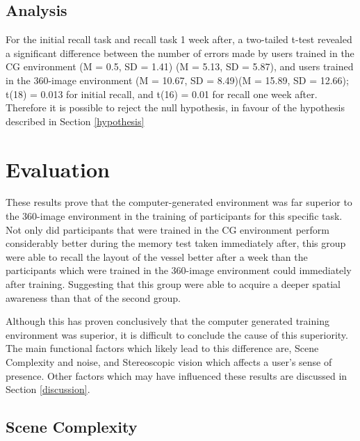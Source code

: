\documentclass[ %
                    author={Elis Jones},
                supervisor={Dr. Kirsten Cater},
                    degree={BSc},
                     title={The Effect of Presentation Medium on Spatial Cognition},
                  subtitle={in the Virtual Environment},
                      year={2018} ]{dissertation}
\begin{document}
\subsection{Analysis}
For the initial recall task and recall task 1 week after, a two-tailed t-test revealed a significant difference between the number of errors made by users trained in the CG environment (M = 0.5, SD = 1.41) (M = 5.13, SD = 5.87),  and users trained in the 360-image environment (M = 10.67, SD = 8.49)(M = 15.89, SD = 12.66); t(18) = 0.013 for initial recall, and t(16) = 0.01 for recall one week after. Therefore it is possible to reject the null hypothesis, in favour of the hypothesis described in Section \ref{hypothesis}

\section{Evaluation}
These results prove that the computer-generated environment was far superior to the 360-image environment in the training of participants for this specific task. Not only did participants that were trained in the CG environment perform considerably better during the memory test taken immediately after, this group were able to recall the layout of the vessel better after a week than the participants which were trained in the 360-image environment could immediately after training. Suggesting that this group were able to acquire a deeper spatial awareness than that of the second group. 

Although this has proven conclusively that the computer generated training environment was superior, it is difficult to conclude the cause of this superiority. The main functional factors which likely lead to this difference are, Scene Complexity and noise, and Stereoscopic vision which affects a user's sense of presence. Other factors which may have influenced these results are discussed in Section \ref{discussion}.

\subsection{Scene Complexity}
\end{document}
